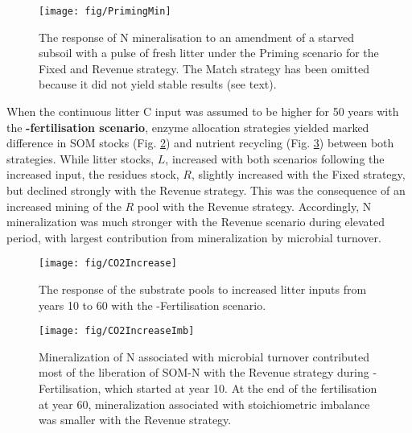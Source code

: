 \begin{figure}[t]
\vspace*{2mm}
\begin{center}
\texttt{[image: fig/PrimingMin]}
\end{center}
\caption{The response of N mineralisation to an amendment of a starved subsoil with a pulse of fresh litter under the Priming scenario for the Fixed and Revenue strategy. The Match strategy has been omitted because it did not yield stable results (see text).
\label{fig:PrimingMin}}
\end{figure}

When the continuous litter C input was assumed to be higher for 50 years with
the \textbf{-fertilisation scenario}, enzyme allocation strategies
yielded marked difference in SOM stocks (Fig. \ref{fig:CO2Increase}) and
nutrient recycling (Fig. \ref{fig:CO2IncreaseImb}) between both strategies.
While litter stocks, $L$, increased with both scenarios following the increased
input, the residues stock, $R$, slightly increased with the Fixed strategy, but
declined strongly with the Revenue strategy. This was the consequence of an
increased mining of the $R$ pool with the Revenue strategy. Accordingly, N
mineralization was much stronger with the Revenue scenario during elevated
 period, with largest contribution from mineralization by microbial
turnover.


\begin{figure}[t] \vspace*{2mm}
\begin{center}
\texttt{[image: fig/CO2Increase]}
\end{center}
\caption{The response of the substrate pools to increased litter inputs from years 10 to 60 with the -Fertilisation scenario.
\label{fig:CO2Increase}}

\end{figure}
\begin{figure}[t] \vspace*{2mm}
\begin{center}
\texttt{[image: fig/CO2IncreaseImb]} 
\end{center}
\caption{
Mineralization of N associated with microbial turnover 
contributed most of the liberation of SOM-N with the Revenue strategy during
-Fertilisation, which started at year 10.
At the end of the fertilisation at year 60, mineralization associated 
with stoichiometric imbalance was smaller with the Revenue strategy.
\label{fig:CO2IncreaseImb}}
\end{figure}

